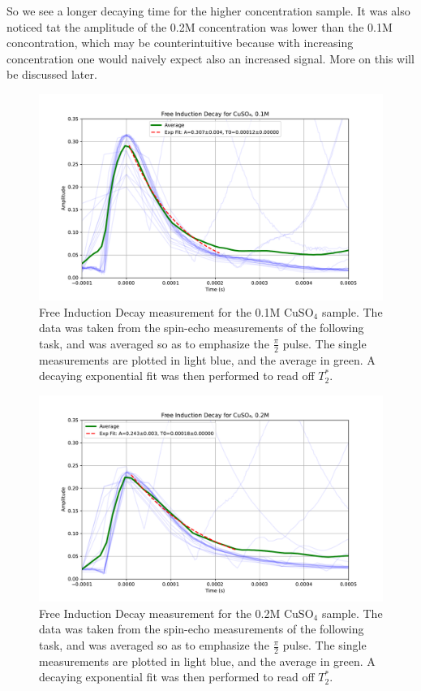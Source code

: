 \documentclass[12pt]{article}
\begin{document}
So we see a longer decaying time for the higher concentration sample. It was also noticed tat the amplitude of the 0.2M concentration was lower than the 0.1M concontration, which may be counterintuitive because with increasing concentration one would naively expect also an increased signal. More on this will be discussed later.

\begin{figure}[H]
  \includegraphics[scale = 0.5]{Free_Induction_Decay_0.1M.pdf}
  \caption{Free Induction Decay measurement for the 0.1M $\text{CuSO}_4$ sample. The data was taken from the spin-echo measurements of the following task, and was averaged so as to emphasize the $\frac{\pi}{2}$ pulse. The single measurements are plotted in light blue, and the average in green. A decaying exponential fit was then performed to read off $T_2^*$.}
  \label{Free_Induction_Decay_0.1M.pdf}
\end{figure}

\begin{figure}[H]
  \includegraphics[scale = 0.5]{Free_Induction_Decay_0.2M.pdf}
  \caption{Free Induction Decay measurement for the 0.2M $\text{CuSO}_4$ sample. The data was taken from the spin-echo measurements of the following task, and was averaged so as to emphasize the $\frac{\pi}{2}$ pulse. The single measurements are plotted in light blue, and the average in green. A decaying exponential fit was then performed to read off $T_2^*$.}
  \label{Free_Induction_Decay_0.2M.pdf}
\end{figure}
\end{document}
